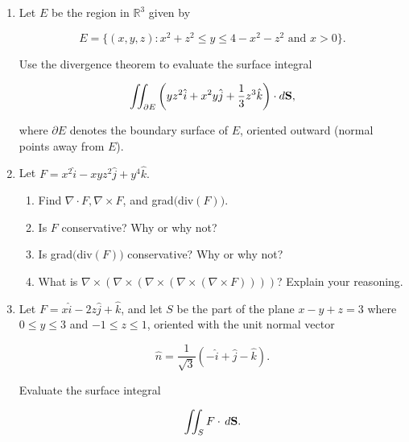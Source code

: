 \documentclass[12 pt]{report}
\begin{document}
\newpage
\begin{enumerate}

\item Let $E$ be the region in $\mathbb{R}^3$ given by 

\begin{equation*}
E = \{(x,y,z):  x^2 + z^2 \leq y \leq 4 - x^2 - z^2 \text{ and } x > 0 \}.
\end{equation*}

Use the divergence theorem to evaluate the surface integral

$$\iint_{\partial E} \left( yz^2\hat{i} +x^2 y \hat{j} + \frac{1}{3}z^3 \hat{k} \right) \cdot d \bold{S},$$

where $\partial E$ denotes the boundary surface of $E$, oriented outward (normal points away from $E$). 
\newpage

\item Let $F = x^2 \hat{i} - xyz^2 \hat{j} + y^4 \hat{k}.$ 

\begin{enumerate} \item Find $\nabla \cdot F, \nabla \times F$, and grad$($div$(F))$.

\vfill

\item Is $F$ conservative? Why or why not?

\vfill 

\item Is grad$($div$(F))$ conservative? Why or why not?

\vfill

\item What is $\nabla \times (\nabla \times( \nabla \times (\nabla \times (\nabla \times F))))$? Explain your reasoning. 

\vfill

\end{enumerate} 
 
\newpage

\item Let $F = x \hat{i} - 2z \hat{j} + \hat{k}$, and let $S$ be the part of the plane $x - y + z = 3$ where $0 \leq y \leq 3$ and $-1 \leq z \leq 1$, oriented with the unit normal vector 

$$\hat{n} = \frac{1}{\sqrt{3}}\left(-\hat{i} + \hat{j} - \hat{k}\right).$$

Evaluate the surface integral 

\begin{equation*}
\iint_S F \cdot \, d\bold{S}.
\end{equation*}



\end{enumerate}
\end{document}
